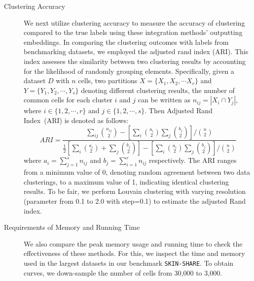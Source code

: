 \begin{description}
	\item[Clustering Accuracy] We next utilize clustering accuracy to measure the accuracy of clustering compared to the true labels using these integration methods' outputting embeddings. In comparing the clustering outcomes with labels from benchmarking datasets, we employed the adjusted rand index (ARI)\citep{hubert1985ARI}. This index assesses the similarity between two clustering results by accounting for the likelihood of randomly grouping elements. Specifically, given a dataset $D$ with $n$ cells, two partitions $ X = \{ X_{1}, X_{2}, \cdots X_{r} \} $ and $ Y = \{ Y_{1}, Y_{2}, \cdots, Y_{s} \} $ denoting different clustering results, the number of common cells for each cluster $i$ and $j$ can be written as $n_{ij} = | X_{i} \cap Y_{j} |$, where $ i \in \{1, 2, \cdots, r \} $ and $ j \in \{1, 2, \cdots, s \} $. Then Adjusted Rand Index~(ARI) is denoted as follows:
	\begin{equation}
		ARI = \frac{\sum_{ij} {n_{ij} \choose 2} - [ \sum_{i} {a_{i} \choose 2} \sum_{j} {b_{j} \choose 2 } ] / {n \choose 2}}{\frac{1}{2} [\sum_{i} {a_{i} \choose 2 } + \sum_{j} {b_{j} \choose 2}] - [\sum_{i} {a_{i} \choose 2} \sum_{j} {b_{j} \choose 2 } ] / {n \choose 2} }
	\end{equation}
	where $ a_{i} = \sum_{j=1}^{s} n_{ij} $ and $ b_{j} = \sum_{i=1}^{r} n_{ij} $ respectively. The ARI ranges from a minimum value of 0, denoting random agreement between two data clusterings, to a maximum value of 1, indicating identical clustering results.  To be fair, we perform Louvain clustering with varying resolution (parameter from 0.1 to 2.0 with step=0.1) to estimate the adjusted Rand index. 

	\item[Requirements of Memory and Running Time] We also compare the peak memory usage and running time to check the effectiveness of these methods. For this, we inspect the time and memory used in the largest datasets in our benchmark \texttt{SKIN-SHARE}. To obtain curves, we down-sample the number of cells from 30,000 to 3,000.
\end{description}




